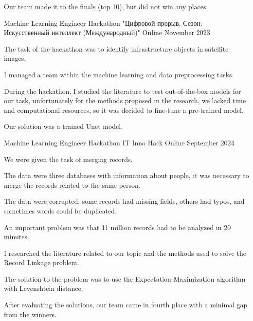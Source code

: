 \begin{cventries}
{\begin{cvitems}
    \item {Our team made it to the finals (top 10), but did not win any places. }
  \end{cvitems}
}
\cventry
{Machine Learning Engineer} %
{Hackathon "Цифровой прорыв. Сезон: Искусственный интеллект (Международный)"} %
{Online} %
{November 2023} %
{
  \begin{cvitems} %
    \item {The task of the hackathon was to identify infrastructure objects in satellite images. }
    \item {I managed a team within the machine learning and data preprocessing tasks. }
    \item {During the hackathon, I studied the literature to test out-of-the-box models for our task, unfortunately for the methods proposed in the research, we lacked time and computational resources, so it was decided to fine-tune a pre-trained model. }
    \item {Our solution was a trained Unet model. } 
  \end{cvitems}
}
\cventry
{Machine Learning Engineer} %
{Hackathon IT Inno Hack} %
{Online} %
{September 2024} %
{
  \begin{cvitems} %
    \item {We were given the task of merging records. }
    \item {The data were three databases with information about people, it was necessary to merge the records related to the same person. }
    \item {The data were corrupted: some records had missing fields, others had typos, and sometimes words could be duplicated. }
    \item {An important problem was that 11 million records had to be analyzed in 20 minutes. }
    \item {I researched the literature related to our topic and the methods used to solve the Record Linkage problem. } 
    \item {The solution to the problem was to use the Expectation-Maximization algorithm with Levenshtein distance. }
    \item {After evaluating the solutions, our team came in fourth place with a minimal gap from the winners. }

\end{cvitems}}
\end{cventries}
